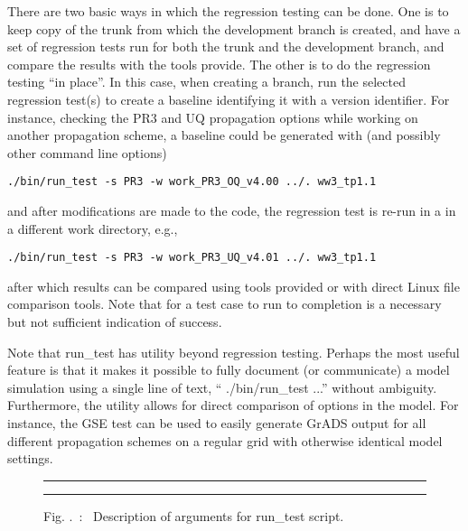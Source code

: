 \documentclass[12pt]{article}
\newcommand{\topline}{\rule{152mm}{0.5mm}}
\newcommand{\botline}{\vspace{1 mm}\rule{152mm}{0.5mm}}
\newcommand{\file}{\sf}
\newcommand{\code}{\tt}
\newcommand{\command}[1]{\begin{center}{\code #1}\end{center}}
\newcommand{\pb}{\strut \vfill \pagebreak}
\newcounter{myfigno}[section]
\newenvironment{myfig}[1]{\begin{figure}[#1]
                         \refstepcounter{myfigno}}                       
                        {\end{figure}}
\newcommand{\myfcapc}[1]{\begin{center} \ff Fig. \themyfigno\ :~ #1
                         \end{center}}
\renewcommand{\themyfigno}{\thesection.\arabic{myfigno}}
\begin{document}
There are two basic ways in which the regression testing can be done. One is
to keep copy of the trunk from which the development branch is created, and
have a set of regression tests run for both the trunk and the development
branch, and compare the results with the tools provide. The other is to do the
regression testing ``in place''. In this case, when creating a branch, run the
selected regression test(s) to create a baseline identifying it with a version
identifier. For instance, checking the PR3 and UQ propagation options while
working on another propagation scheme, a baseline could be generated with (and
possibly other command line options) \command{./bin/run\_test -s PR3 -w
  work\_PR3\_OQ\_v4.00 ../. ww3\_tp1.1} and after modifications are made to
the code, the regression test is re-run in a in a different work directory,
e.g., \command{./bin/run\_test -s PR3 -w work\_PR3\_UQ\_v4.01 ../. ww3\_tp1.1}
after which results can be compared using tools provided or with direct Linux
file comparison tools.  Note that for a test case to run to completion is a
necessary but not sufficient indication of success.

Note that {\file run\_test} has utility beyond regression testing. Perhaps the
most useful feature is that it makes it possible to fully document (or
communicate) a model simulation using a single line of text, ``{\file
  ./bin/run\_test} ...'' without ambiguity. Furthermore, the utility allows
for direct comparison of options in the model. For instance, the GSE test can
be used to easily generate GrADS output for all different propagation schemes
on a regular grid with otherwise identical model settings.



\pb

\begin{myfig}{tbp}
\topline
\begin{center}
{\scriptsize \begin{minipage}[c]{4.5in}

\end{minipage} }

\end{center}
\botline
\myfcapc{Description of arguments for {\file run\_test} script.}
\label{fig:run_test}
\end{myfig}
\end{document}
